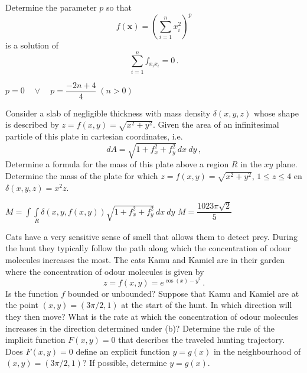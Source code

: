 \begin{Exercise} %
Determine the parameter $p$ so that
$$
f(\mathbf{x})=\left(\sum\limits_{i=1}^{n}x_i^2\right)^p
$$
is a solution of 
$$
\sum\limits_{i=1}^{n}f_{x_ix_i}=0\,.
$$
\end{Exercise}

\begin{Answer}\phantom{}
$p=0 \quad \vee \quad p = \dfrac{-2n+4}{4} \; (n>0)$
\end{Answer}

\begin{Exercise} %
Consider a slab of negligible thickness with mass density $\delta(x,y,z)$ whose shape is described by $z=f(x,y)=\sqrt{x^2+y^2}$.
\Question Given the area of an infinitesimal particle of this plate in cartesian coordinates, i.e.
    $$
    dA=\sqrt{1+f_x^2+f_y^2}\,dx\ dy\,,
    $$
Determine a formula for the mass of this plate above a region $R$ in the $xy$ plane.
\Question Determine the mass of the plate for which $z=f(x,y)=\sqrt{x^2+y^2}$, $1\leq z\leq4$ en $\delta(x,y,z)=x^2z$.
\EndCurrentQuestion
\end{Exercise}

\begin{Answer}

\Question $M = \displaystyle \int\int \limits_{R} \delta \left(x,y,f(x,y)\right) \sqrt{1+f_x^2+f_y^2}\,dx\ dy$
\Question $M = \dfrac{1023 \pi \sqrt{2}}{5}$

\end{Answer}

\begin{Exercise} %
Cats have a very sensitive sense of smell that allows them to detect prey. During the hunt they typically follow the path along which the concentration of odour molecules increases the most. The cats Kamu and Kamiel are in their garden where the concentration of odour molecules is given by
$$
z=f(x,y)=e^{\cos(x)-y^2}\,.
$$
\Question Is the function $f$ bounded or unbounded?
\Question Suppose that Kamu and Kamiel are at the point $(x,y)=(3\pi/2,1)$ at the start of the hunt. In which direction will they then move?
\Question What is the rate at which the concentration of odour molecules increases in the direction determined under (b)?
\Question Determine the rule of the implicit function $F(x,y)=0$ that describes the traveled hunting trajectory.
\Question Does $F(x,y)=0$ define an explicit function $y=g(x)$ in the neighbourhood of $(x,y)=(3\pi/2,1)$?
\Question If possible, determine $y=g(x)$.
\EndCurrentQuestion
\end{Exercise}

